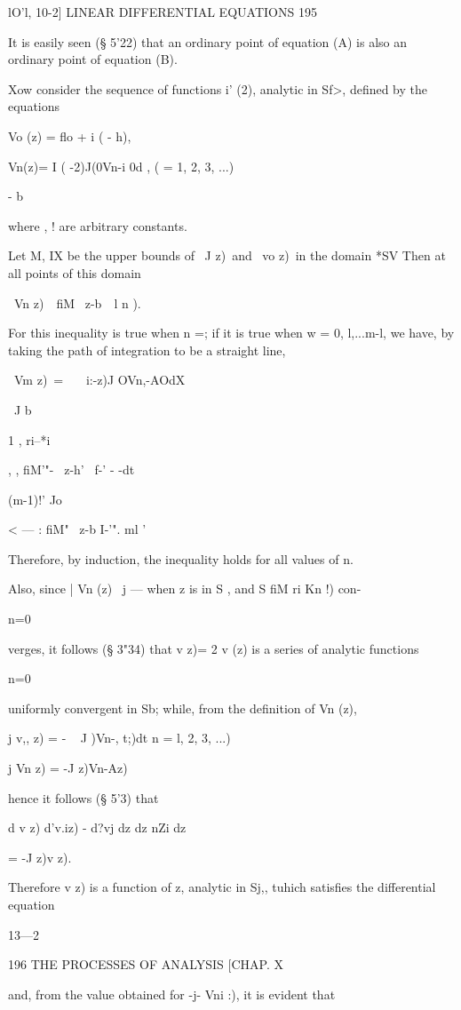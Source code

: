 lO'l, 10-2] LINEAR DIFFERENTIAL EQUATIONS 195

It is easily seen (§ 5'22) that an ordinary point of equation (A) is
also an ordinary point of equation (B).

Xow consider the sequence of functions i' (2), analytic in Sf>,
defined by the equations

Vo (z) = flo + i ( - h),

Vn(z)= I ( -2)J(0Vn-i 0d , ( = 1, 2, 3, ...)

- b

where , ! are arbitrary constants.

Let M, IX be the upper bounds of \ J z)\ and \ vo z)\ in the domain
*SV Then at all points of this domain

\ Vn z)\ \ fiM \ z-b\ \ l n ).

For this inequality is true when n =; if it is true when w = 0,
l,...m-l, we have, by taking the path of integration to be a straight
line,

\ Vm z)\ = \ \ \ i:-z)J OVn,-AOdX

\ J b

1 , ri--*i

  , , fiM'"- \ z-h' \ f-' - -dt

(m-1)!' Jo

< — : fiM" \ z-b I-'". ml '

Therefore, by induction, the inequality holds for all values of n.

Also, since | Vn (z) \ j — when z is in S , and S fiM ri Kn !) con-

    n=0

verges, it follows (§ 3"34) that v z)= 2 v (z) is a series of analytic
functions

n=0

uniformly convergent in Sb; while, from the definition of Vn (z),

j v,, z) = - ~ J \;)Vn-, t;)dt n = l, 2, 3, ...)

j Vn z) = -J z)Vn-Az)\

hence it follows (§ 5'3) that

d v z) d'v.iz) - d?vj dz dz nZi dz

= -J z)v z).

Therefore v z) is a function of z, analytic in Sj,, tuhich satisfies
the differential equation

13—2

196 THE PROCESSES OF ANALYSIS [CHAP. X

and, from the value obtained for -j- Vni :), it is evident that

